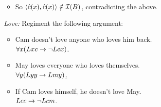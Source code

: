 \documentclass[a4paper, 11pt]{article} %
\begin{document}
\begin{enumerate}
\begin{itemize}
      \item So $\langle\hat{c}(x),\hat{c}(x)\rangle\notin\mathcal{I}(B)$, contradicting the above.
    \end{itemize}
  \item[\it Love:] Regiment the following argument:
    \begin{itemize}
      \item Cam doesn't love anyone who loves him back.\\
        $\forall x(Lxc \rightarrow \neg Lcx)$.
      \item May loves everyone who loves themselves.\\
        \underline{$\forall y(Lyy \rightarrow Lmy)$.\quad}
      \item If Cam loves himself, he doesn't love May.\\
        $Lcc \rightarrow \neg Lcm$.
    \end{itemize}

\end{enumerate}
\end{document}
